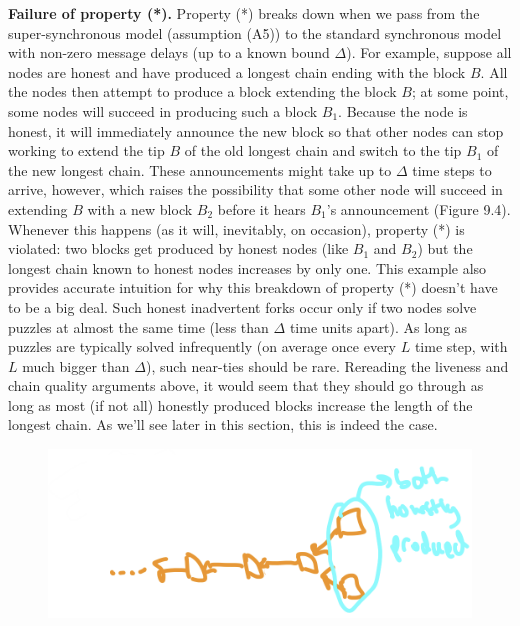 \noindent
\textbf{Failure of property (*).} Property (*) breaks down when we pass from the super-synchronous
model (assumption (A5)) to the standard synchronous model with non-zero message delays
(up to a known bound $\Delta$). For example, suppose all nodes are honest and have produced
a longest chain ending with the block $B$. All the nodes then attempt to produce a block
extending the block $B$; at some point, some nodes will succeed in producing such a block $B_1$.
Because the node is honest, it will immediately announce the new block so that other nodes
can stop working to extend the tip $B$ of the old longest chain and switch to the tip $B_1$ of the
new longest chain. These announcements might take up to $\Delta$ time steps to arrive, however,
which raises the possibility that some other node will succeed in extending $B$ with a new
block $B_2$ before it hears $B_1$’s announcement (Figure 9.4). Whenever this happens (as it will,
inevitably, on occasion), property (*) is violated: two blocks get produced by honest nodes
(like $B_1$ and $B_2$) but the longest chain known to honest nodes increases by only one.
This example also provides accurate intuition for why this breakdown of property (*)
doesn't have to be a big deal. Such honest inadvertent forks occur only if two nodes solve
puzzles at almost the same time (less than $\Delta$ time units apart). As long as puzzles are typically solved infrequently (on average once every $L$ time step, with $L$ much bigger than $\Delta$),
such near-ties should be rare. Rereading the liveness and chain quality arguments above, it
would seem that they should go through as long as most (if not all) honestly produced blocks
increase the length of the longest chain. As we’ll see later in this section, this is indeed the
case.\\

\begin{figure}[h]
    \centering
    \includegraphics[scale = 0.5]{figures/f40.png}
    \caption{}
    \label{fig:mesh1}
\end{figure}\\

